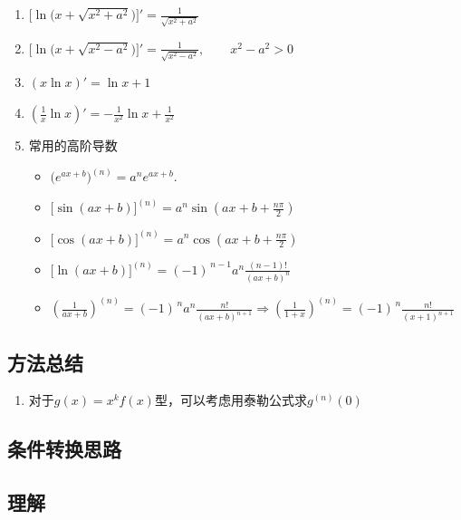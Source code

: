 \documentclass[a4paper,12pt]{article}
\begin{document}
    \begin{enumerate}
        \item $\bigl[\ln\bigl(x+\sqrt{x^2+a^2}\bigr)\bigr]' = \displaystyle\frac{1}{\sqrt{x^2+a^2}}$
        \item $\bigl[\ln\bigl(x+\sqrt{x^2-a^2}\bigr)\bigr]' = \displaystyle\frac{1}{\sqrt{x^2-a^2}}, \qquad x^2-a^2>0$
        \item $(x\ln x)' = \ln x + 1$
        \item $(\displaystyle\frac{1}{x} \ln x)' = -\displaystyle\frac{1}{x^2} \ln x + \frac{1}{x^2}$
        \item 常用的高阶导数
        \begin{itemize}
            \item $\bigl(e^{ax+b}\bigr)^{(n)} = a^{n} e^{ax+b}.$
            \item $\bigl[\sin(ax+b)\bigr]^{(n)} = a^{n} \sin\!\left(ax+b+\displaystyle\frac{n\pi}{2}\right)$
            \item $\bigl[\cos(ax+b)\bigr]^{(n)} = a^{n} \cos\!\left(ax+b+\displaystyle\frac{n\pi}{2}\right)$
            \item $\bigl[\ln(ax+b)\bigr]^{(n)} = (-1)^{\,n-1}a^{n}\displaystyle\frac{(n-1)!}{(ax+b)^{n}}$
            \item $\left(\displaystyle\frac{1}{ax+b}\right)^{(n)} = (-1)^{\,n}a^{n}\displaystyle\frac{n!}{(ax+b)^{n+1}} \Rightarrow (\displaystyle\frac{1}{1 + x})^{(n)} = (-1)^{\,n}\displaystyle\frac{n!}{(x+1)^{n+1}}$
        \end{itemize}
    \end{enumerate}

    \subsection{方法总结}

    \begin{enumerate}
        \item 对于$g(x) = x^k f(x)$型，可以考虑用泰勒公式求$g^{(n)}(0)$
    \end{enumerate}

    \subsection{条件转换思路}

    \begin{enumerate}

    \end{enumerate}

    \subsection{理解}

    \begin{enumerate}
    \end{enumerate}
\end{document}
